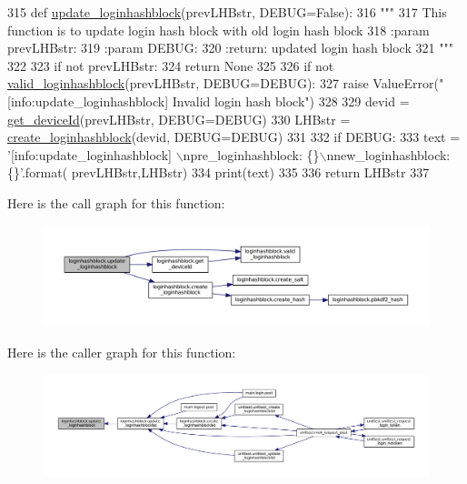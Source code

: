 \begin{DoxyCode}
315 \textcolor{keyword}{def }\hyperlink{namespaceloginhashblock_afef75d97c834ce0fda711b93d0b56b00}{update\_loginhashblock}(prevLHBstr, DEBUG=False):
316     \textcolor{stringliteral}{"""}
317 \textcolor{stringliteral}{    This function is to update login hash block with old login hash block}
318 \textcolor{stringliteral}{    :param prevLHBstr:}
319 \textcolor{stringliteral}{    :param DEBUG:}
320 \textcolor{stringliteral}{    :return: updated login hash block}
321 \textcolor{stringliteral}{    """}
322 
323     \textcolor{keywordflow}{if} \textcolor{keywordflow}{not} prevLHBstr:
324         \textcolor{keywordflow}{return} \textcolor{keywordtype}{None}
325 
326     \textcolor{keywordflow}{if} \textcolor{keywordflow}{not} \hyperlink{namespaceloginhashblock_adb424539d851426da7b65d53c5a6d577}{valid\_loginhashblock}(prevLHBstr, DEBUG=DEBUG):
327         \textcolor{keywordflow}{raise} ValueError(\textcolor{stringliteral}{"[info:update\_loginhashblock] Invalid login hash block"})
328 
329     devid = \hyperlink{namespaceloginhashblock_a17417f2f6bca76ab51170082a562e5f6}{get\_deviceId}(prevLHBstr, DEBUG=DEBUG)
330     LHBstr = \hyperlink{namespaceloginhashblock_ad3ef8dab740c69ca8424797f9c146a53}{create\_loginhashblock}(devid, DEBUG=DEBUG)
331 
332     \textcolor{keywordflow}{if} DEBUG:
333         text = \textcolor{stringliteral}{'[info:update\_loginhashblock] \(\backslash\)npre\_loginhashblock: \{\}\(\backslash\)nnew\_loginhashblock: \{\}'}.format(
      prevLHBstr,LHBstr)
334         print(text)
335 
336     \textcolor{keywordflow}{return} LHBstr
337 
\end{DoxyCode}


Here is the call graph for this function\+:
\nopagebreak
\begin{figure}[H]
\begin{center}
\leavevmode
\includegraphics[width=350pt]{namespaceloginhashblock_afef75d97c834ce0fda711b93d0b56b00_cgraph}
\end{center}
\end{figure}




Here is the caller graph for this function\+:
\nopagebreak
\begin{figure}[H]
\begin{center}
\leavevmode
\includegraphics[width=350pt]{namespaceloginhashblock_afef75d97c834ce0fda711b93d0b56b00_icgraph}
\end{center}
\end{figure}


